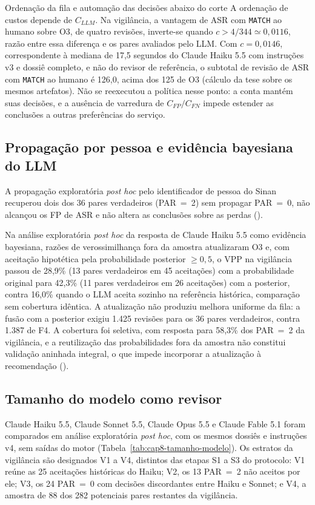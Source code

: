 \begin{chapter}{Ordenação da fila e automação das decisões abaixo do corte}
A ordenação de custos depende de $C_{LLM}$. Na vigilância, a vantagem de ASR com \texttt{MATCH} ao humano sobre O3, de quatro revisões, inverte-se quando $c>4/344\simeq0{,}0116$, razão entre essa diferença e os pares avaliados pelo LLM. Com $c=0{,}0146$, correspondente à mediana de 17,5 segundos do Claude Haiku 5.5 com instruções v3 e dossiê completo, e não do revisor de referência, o subtotal de revisão de ASR com \texttt{MATCH} ao humano é 126,0, acima dos 125 de O3 (cálculo da tese sobre os mesmos artefatos). Não se reexecutou a política nesse ponto: a conta mantém suas decisões, e a ausência de varredura de $C_{FP}/C_{FN}$ impede estender as conclusões a outras preferências do serviço.

\subsection{Propagação por pessoa e evidência bayesiana do LLM}\label{sec:e4-propagacao-evidencia}

A propagação exploratória \textit{post hoc} pelo identificador de pessoa do Sinan recuperou dois dos 36 pares verdadeiros (PAR~=~2) sem propagar PAR~=~0, não alcançou os FP de ASR e não altera as conclusões sobre as perdas ().

Na análise exploratória \textit{post hoc} da resposta de Claude Haiku 5.5 como evidência bayesiana, razões de verossimilhança fora da amostra atualizaram O3 e, com aceitação hipotética pela probabilidade posterior $\geq0{,}5$, o VPP na vigilância passou de 28,9\% (13 pares verdadeiros em 45 aceitações) com a probabilidade original para 42,3\% (11 pares verdadeiros em 26 aceitações) com a posterior, contra 16,0\% quando o LLM aceita sozinho na referência histórica, comparação sem cobertura idêntica. A atualização não produziu melhora uniforme da fila: a fusão com a posterior exigiu 1.425 revisões para os 36 pares verdadeiros, contra 1.387 de F4. A cobertura foi seletiva, com resposta para 58,3\% dos PAR~=~2 da vigilância, e a reutilização das probabilidades fora da amostra não constitui validação aninhada integral, o que impede incorporar a atualização à recomendação ().

\subsection{Tamanho do modelo como revisor}\label{sec:e4-tamanho-modelo}

Claude Haiku 5.5, Claude Sonnet 5.5, Claude Opus 5.5 e Claude Fable 5.1 foram comparados em análise exploratória \textit{post hoc}, com os mesmos dossiês e instruções v4, sem saídas do motor (Tabela~\ref{tab:cap8-tamanho-modelo}). Os estratos da vigilância são designados V1 a V4, distintos das etapas S1 a S3 do protocolo: V1 reúne as 25 aceitações históricas do Haiku; V2, os 13 PAR~=~2 não aceitos por ele; V3, os 24 PAR~=~0 com decisões discordantes entre Haiku e Sonnet; e V4, a amostra de 88 dos 282 potenciais pares restantes da vigilância.


\end{chapter}
